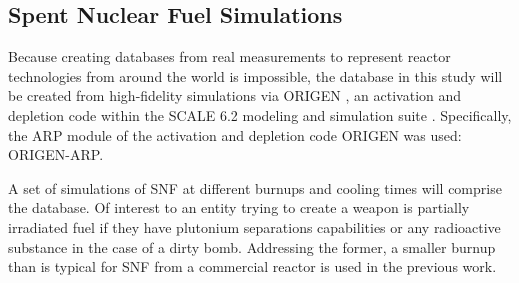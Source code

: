 \subsection{Spent Nuclear Fuel Simulations}
\label{sec:snfsim}

Because creating databases from real measurements to represent reactor
technologies from around the world is impossible, the database in this study
will be created from high-fidelity simulations via \gls{ORIGEN} \cite{origen},
an activation and depletion code within the \gls{SCALE} 6.2 modeling and simulation
suite \cite{scale}. Specifically, the ARP module of the activation and
depletion code ORIGEN was used: \gls{ORIGEN-ARP}.

A set of simulations of \gls{SNF} at different burnups and cooling times will
comprise the database.  Of interest to an entity trying to create a weapon is
partially irradiated fuel if they have plutonium separations capabilities or
any radioactive substance in the case of a dirty bomb.  Addressing the former,
a smaller burnup than is typical for \gls{SNF} from a commercial reactor is
used in the previous work.  

